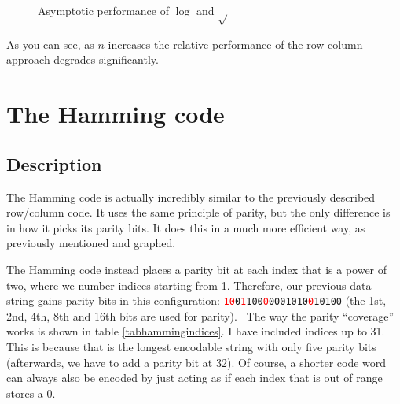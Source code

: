 \documentclass[a4paper,11pt]{article}
\begin{document}
\begin{figure}[H]
\begin{center}
\end{center}
\caption{Asymptotic performance of $\log$ and $\sqrt{}$}\label{figlogsqrtplot}
\end{figure}

    As you can see, as $n$ increases the relative performance of the row-column
    approach degrades significantly.

    \section{The Hamming code}

    \subsection{Description}

    The Hamming code is actually incredibly similar to the previously described
    row/column code. It uses the same principle of parity, but the only
    difference is in how it picks its parity bits. It does this in a much more
    efficient way, as previously mentioned and graphed.

    The Hamming code instead places a parity bit at each index that is a power
    of two, where we number indices starting from 1. Therefore, our previous
    data string gains parity bits in this configuration:
    \texttt{\textcolor{red}{10}0\textcolor{red}{1}100\textcolor{red}{0}0001010\textcolor{red}{0}10100}
    (the 1st, 2nd, 4th, 8th and 16th bits are used for parity).
\
    The way the parity ``coverage'' works is shown in table
    \ref{tabhammingindices}.  I have included indices up to 31. This is
    because that is the longest encodable string with only five parity bits
    (afterwards, we have to add a parity bit at 32). Of course, a shorter code
    word can always also be encoded by just acting as if each index that is out
    of range stores a 0.
\end{document}
